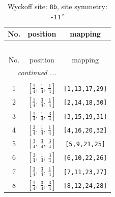 \documentclass[fleqn,8pt]{jsarticle}
\begin{document}
\begin{longtable}{ccc}
\caption{Wyckoff site: {\tt 8b}, site symmetry: {\tt -11'}}
 \\
 \hline \hline
No. & position & mapping \\ \hline \endfirsthead

\multicolumn{2}{l}{\tablename\ \thetable{}} \\
 \hline \hline
No. & position & mapping \\ \hline \endhead

 \hline \hline
\multicolumn{2}{r}{\footnotesize\it continued ...} \\ \endfoot

 \hline \hline
\multicolumn{2}{r}{} \\ \endlastfoot

1 & $\left[ \frac{1}{4},\, \frac{1}{4},\, \frac{1}{4} \right]$ & {\tt [1,13,17,29]} \\ \hline
2 & $\left[ \frac{1}{4},\, \frac{3}{4},\, \frac{1}{4} \right]$ & {\tt [2,14,18,30]} \\ \hline
3 & $\left[ \frac{1}{4},\, \frac{1}{4},\, \frac{3}{4} \right]$ & {\tt [3,15,19,31]} \\ \hline
4 & $\left[ \frac{3}{4},\, \frac{1}{4},\, \frac{1}{4} \right]$ & {\tt [4,16,20,32]} \\ \hline
5 & $\left[ \frac{3}{4},\, \frac{3}{4},\, \frac{3}{4} \right]$ & {\tt [5,9,21,25]} \\ \hline
6 & $\left[ \frac{3}{4},\, \frac{1}{4},\, \frac{3}{4} \right]$ & {\tt [6,10,22,26]} \\ \hline
7 & $\left[ \frac{3}{4},\, \frac{3}{4},\, \frac{1}{4} \right]$ & {\tt [7,11,23,27]} \\ \hline
8 & $\left[ \frac{1}{4},\, \frac{3}{4},\, \frac{3}{4} \right]$ & {\tt [8,12,24,28]} \\
\end{longtable}
\renewcommand{\arraystretch}{1.2}
\end{document}
